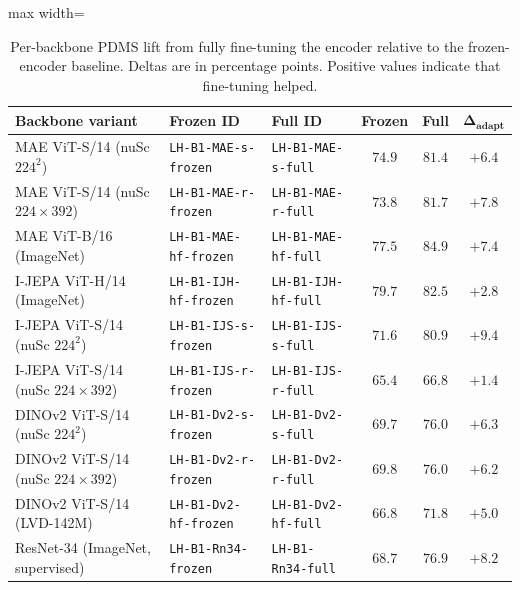 \begin{table}[ht]
\centering
\caption[Fine-tuning deltas: Priority-3 minus Priority-1.]{Per-backbone PDMS lift from fully fine-tuning the encoder relative to the frozen-encoder baseline. Deltas are in percentage points. Positive values indicate that fine-tuning helped.}
\label{tab:exp-phase0-lift}
\scriptsize
\renewcommand{\arraystretch}{1.15}
\setlength{\tabcolsep}{4pt}
\begin{adjustbox}{max width=\textwidth}
\begin{tabular}{@{}lllccc@{}}
\toprule
\textbf{Backbone variant} & \textbf{Frozen ID} & \textbf{Full ID} & \textbf{Frozen} & \textbf{Full} & $\boldsymbol{\Delta_\text{adapt}}$ \\
\midrule
MAE ViT-S/14 (nuSc $224^2$)        & \texttt{LH-B1-MAE-s-frozen} & \texttt{LH-B1-MAE-s-full} & $74.9$ & $81.4$ & $+6.4$ \\
MAE ViT-S/14 (nuSc $224{\times}392$) & \texttt{LH-B1-MAE-r-frozen} & \texttt{LH-B1-MAE-r-full} & $73.8$ & $81.7$ & $+7.8$ \\
MAE ViT-B/16 (ImageNet)            & \texttt{LH-B1-MAE-hf-frozen} & \texttt{LH-B1-MAE-hf-full} & $77.5$ & $84.9$ & $+7.4$ \\
I-JEPA ViT-H/14 (ImageNet)         & \texttt{LH-B1-IJH-hf-frozen} & \texttt{LH-B1-IJH-hf-full} & $79.7$ & $82.5$ & $+2.8$ \\
I-JEPA ViT-S/14 (nuSc $224^2$)     & \texttt{LH-B1-IJS-s-frozen} & \texttt{LH-B1-IJS-s-full} & $71.6$ & $80.9$ & $\mathbf{+9.4}$ \\
I-JEPA ViT-S/14 (nuSc $224{\times}392$) & \texttt{LH-B1-IJS-r-frozen} & \texttt{LH-B1-IJS-r-full} & $65.4$ & $66.8$ & $+1.4$ \\
DINOv2 ViT-S/14 (nuSc $224^2$)     & \texttt{LH-B1-Dv2-s-frozen} & \texttt{LH-B1-Dv2-s-full} & $69.7$ & $76.0$ & $+6.3$ \\
DINOv2 ViT-S/14 (nuSc $224{\times}392$) & \texttt{LH-B1-Dv2-r-frozen} & \texttt{LH-B1-Dv2-r-full} & $69.8$ & $76.0$ & $+6.2$ \\
DINOv2 ViT-S/14 (LVD-142M)         & \texttt{LH-B1-Dv2-hf-frozen} & \texttt{LH-B1-Dv2-hf-full} & $66.8$ & $71.8$ & $+5.0$ \\
\rowcolor{gray!15}
ResNet-34 (ImageNet, supervised)   & \texttt{LH-B1-Rn34-frozen} & \texttt{LH-B1-Rn34-full} & $68.7$ & $76.9$ & $+8.2$ \\
\bottomrule
\end{tabular}
\end{adjustbox}
\end{table}


